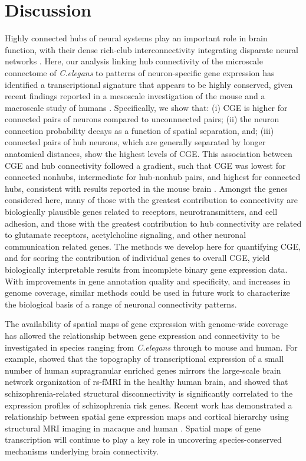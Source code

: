 {\section{Discussion}
Highly connected hubs of neural systems play an important role in brain function, with their dense rich-club interconnectivity integrating disparate neural networks \citep{VandenHeuvel2013b, Fornito2015, DeReus2013b, VandenHeuvel2013a}.
Here, our analysis linking hub connectivity of the microscale connectome of \emph{C.elegans} to patterns of neuron-specific gene expression has identified a transcriptional signature that appears to be highly conserved, given recent findings reported in a mesoscale investigation of the mouse \citep{Fulcher2016} and a macroscale study of humans \citep{Vertes2016b}.
Specifically, we show that:
(i) CGE is higher for connected pairs of neurons compared to unconnnected pairs;
(ii) the neuron connection probability decays as a function of spatial separation, and;
(iii) connected pairs of hub neurons, which are generally separated by longer anatomical distances, show the highest levels of CGE.
This association between CGE and hub connectivity followed a gradient, such that CGE was lowest for connected nonhubs, intermediate for hub-nonhub pairs, and highest for connected hubs, consistent with results reported in the mouse brain \citep{Fulcher2016}.
Amongst the genes considered here, many of those with the greatest contribution to connectivity are biologically plausible genes related to receptors, neurotransmitters, and cell adhesion, and those with the greatest contribution to hub connectivity are related to glutamate receptors, acetylcholine signaling, and other neuronal communication related genes.
The methods we develop here for quantifying CGE, and for scoring the contribution of individual genes to overall CGE, yield biologically interpretable results from incomplete binary gene expression data.
With improvements in gene annotation quality and specificity, and increases in genome coverage, similar methods could be used in future work to characterize the biological basis of a range of neuronal connectivity patterns.

The availability of spatial maps of gene expression with genome-wide coverage has allowed the relationship between gene expression and connectivity to be investigated in species ranging from \textit{C.elegans} through to mouse and human.
For example, \citet{Krienen2016} showed that the topography of transcriptional expression of a small number of human supragranular enriched genes mirrors the large-scale brain network organization of rs-fMRI in the healthy human brain, and \citet{Romme2017} showed that schizophrenia-related structural disconnectivity is significantly correlated to the expression profiles of schizophrenia risk genes.
Recent work has demonstrated a relationship between spatial gene expression maps and cortical hierarchy using structural MRI imaging in macaque and human \citep{Burt2018}.
Spatial maps of gene transcription will continue to play a key role in uncovering species-conserved mechanisms underlying brain connectivity.

}
